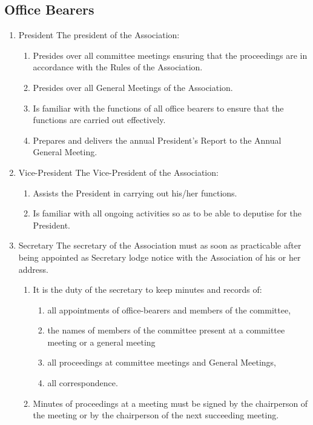 \subsection{Office Bearers}
\begin{enumerate}
  \item President
    The president of the Association:
    \begin{enumerate}
      \item Presides over all committee meetings ensuring that the proceedings are in accordance with the Rules of the Association.
      \item Presides over all General Meetings of the Association.
      \item Is familiar with the functions of all office bearers to ensure that the functions are carried out effectively.
      \item Prepares and delivers the annual President’s Report to the Annual General Meeting.
    \end{enumerate}
  \item Vice-President
    The Vice-President of the Association:
    \begin{enumerate}
      \item Assists the President in carrying out his/her functions.
      \item Is familiar with all ongoing activities so as to be able to deputise for the President.
    \end{enumerate}
  \item Secretary
    The secretary of the Association must as soon as practicable after being appointed as
    Secretary lodge notice with the Association of his or her address.
    \begin{enumerate}
      \item It is the duty of the secretary to keep minutes and records of:
        \begin{enumerate}
          \item all appointments of office-bearers and members of the committee,
          \item the names of members of the committee present at a committee meeting or a general meeting
          \item all proceedings at committee meetings and General Meetings,
          \item all correspondence.
        \end{enumerate}
      \item Minutes of proceedings at a meeting must be signed by the chairperson of the meeting or by the chairperson of the next succeeding meeting.

\end{enumerate}
\end{enumerate}
